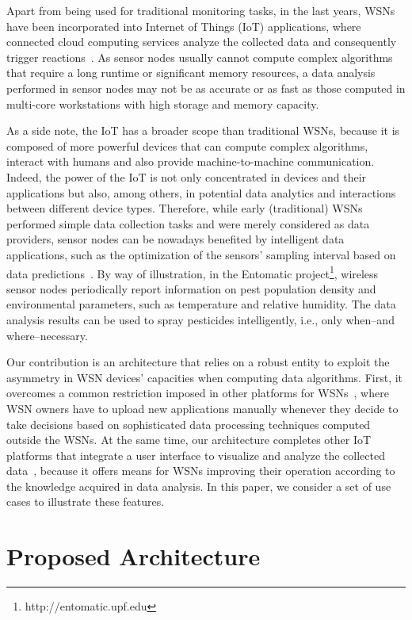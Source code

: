 \documentclass[conference, letterpaper]{IEEEtran}
\begin{document}
Apart from being used for traditional monitoring tasks, in the last years, WSNs have been incorporated into Internet of Things (IoT) applications, where connected cloud computing services analyze the collected data and consequently trigger reactions~\cite{Bellavista2013}. As sensor nodes usually cannot compute complex algorithms that require a long runtime or significant memory resources, a data analysis performed in sensor nodes may not be as accurate or as fast as those computed in multi-core workstations with high storage and memory capacity.

As a side note, the IoT has a broader scope than traditional WSNs, because it is composed of more powerful devices that can compute complex algorithms, interact with humans and also provide machine-to-machine communication. Indeed, the power of the IoT is not only concentrated in devices and their applications but also, among others, in potential data analytics and interactions between different device types. Therefore, while early (traditional) WSNs performed simple data collection tasks and were merely considered as data providers, sensor nodes can be nowadays benefited by intelligent data applications, such as the optimization of the sensors' sampling interval based on data predictions~\cite{Dias2016}. By way of illustration, in the Entomatic project\footnote{http://entomatic.upf.edu}, wireless sensor nodes periodically report information on pest population density and environmental parameters, such as temperature and relative humidity. The data analysis results can be used to spray pesticides intelligently, i.e., only when--and where--necessary.

Our contribution is an architecture that relies on a robust entity to exploit the asymmetry in WSN devices' capacities when computing data algorithms. First, it overcomes a common restriction imposed in other platforms for WSNs~\cite{turon2005mote,ruzzelli2008octopus}, where WSN owners have to upload new applications manually whenever they decide to take decisions based on sophisticated data processing techniques computed outside the WSNs. At the same time, our architecture completes other IoT platforms that integrate a user interface to visualize and analyze the collected data~\cite{nimbits2016,realtimeio2016}, because it offers means for WSNs improving their operation according to the knowledge acquired in data analysis. In this paper, we consider a set of use cases to illustrate these features.

\section{Proposed Architecture}
\label{section:architecture}
\end{document}
